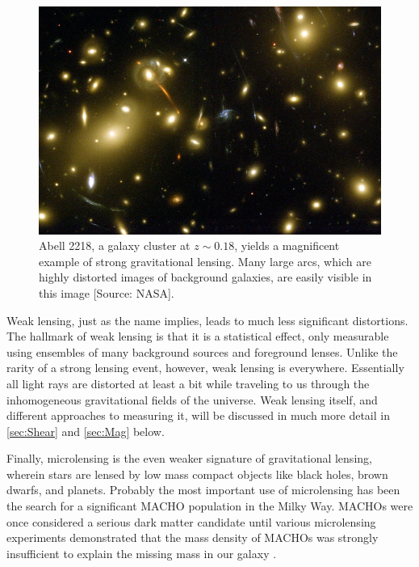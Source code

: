 \begin{figure}
\begin{center}
\includegraphics[scale=1.5]{plots_intro/Abell2218_Med.jpg}
\caption[Strong Lensing Image]{Abell 2218, a galaxy cluster at $z \sim 0.18$, yields a magnificent example of strong gravitational lensing. Many large arcs, which are highly distorted images of background galaxies, are easily visible in this image [Source: NASA].}
\label{plot:abellcluster}
\end{center}
\end{figure}

Weak lensing, just as the name implies, leads to much less significant distortions. The hallmark of weak lensing is that it is a statistical effect, only measurable using ensembles of many background sources and foreground lenses. Unlike the rarity of a strong lensing event, however, weak lensing is everywhere. Essentially all light rays are distorted at least a bit while traveling to us through the inhomogeneous gravitational fields of the universe. Weak lensing itself, and different approaches to measuring it, will be discussed in much more detail in \autoref{sec:Shear} and \autoref{sec:Mag} below. 

Finally, microlensing is the even weaker signature of gravitational lensing, wherein stars are lensed by low mass compact objects like black holes, brown dwarfs, and planets. Probably the most important use of microlensing has been the search for a significant \acf{MACHO} population in the Milky Way. \ac{MACHO}s were once considered a serious dark matter candidate until various microlensing experiments demonstrated that the mass density of \ac{MACHO}s was strongly insufficient to explain the missing mass in our galaxy \citep{Paczynski96,Wyrzykowski11,Sumi13}.

